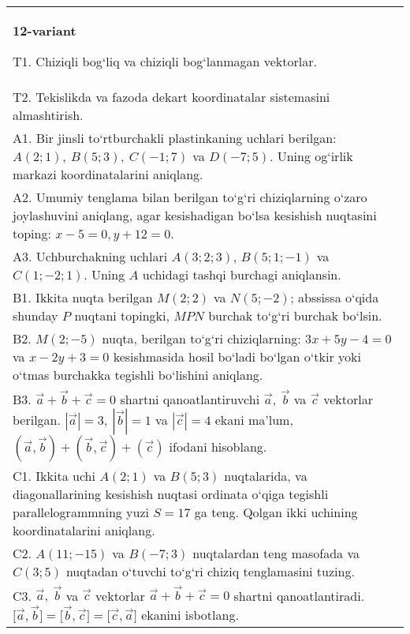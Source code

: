 \documentclass{article}
\begin{document}
\begin{tabular}{m{17cm}}
\textbf{12-variant}
\newline

T1. 
Chiziqli bog‘liq va chiziqli bog‘lanmagan vektorlar.
 \\
T2. Tekislikda va fazoda dekart koordinatalar sistemasini almashtirish.
 \\
A1. 
Bir jinsli to‘rtburchakli plastinkaning uchlari berilgan:
$A (2;1), \ B (5;3), \ C (-1;7) $ va $D (-7;5) $. Uning og‘irlik markazi
koordinatalarini aniqlang.
 \\
A2. 
Umumiy tenglama bilan berilgan to‘g‘ri chiziqlarning
o‘zaro joylashuvini aniqlang, agar kesishadigan bo‘lsa kesishish nuqtasini
toping: $x-5=0, y+12=0$.
 \\
A3. 
Uchburchakning uchlari
$A (3;2; 3) $, $B (5;1; - 1) $ va $C (1; -2;1) $. Uning $A$ uchidagi tashqi burchagi aniqlansin.
 \\
B1. 
Ikkita nuqta berilgan \(M (2;2) \) va \(N (5;-2) \); abssissa o‘qida shunday $P$ nuqtani topingki, $MPN$ burchak to‘g‘ri burchak bo‘lsin.
 \\
B2. 
\(M (2;-5) \) nuqta, berilgan to‘g‘ri chiziqlarning:
\(3x+5y-4=0\) va \(x-2y+3=0\) kesishmasida hosil bo‘ladi
bo‘lgan o‘tkir yoki o‘tmas burchakka tegishli bo‘lishini aniqlang.
 \\
B3. 
$\vec{a} + \vec{b} + \vec{c} = 0$ shartni qanoatlantiruvchi $\vec{a},\ \vec{b}$ va $\vec{c}$ vektorlar berilgan. $|\vec{a}| = 3,\ |\vec{b}| = 1$ va $|\vec{c}| = 4$ ekani ma’lum, $\left(\vec{a},\vec{b} \right) + \left(\vec{b},\vec{c} \right) + (\vec{c}) $ ifodani hisoblang.
 \\
C1. 
Ikkita uchi \(A (2;1) \) va \(B (5; 3) \) nuqtalarida, va
diagonallarining kesishish nuqtasi ordinata o‘qiga tegishli
parallelogrammning yuzi \(S = 17\) ga teng. Qolgan ikki uchining
koordinatalarini aniqlang. \\
C2. 
\(A (11; - 15) \) va \(B (-7;3) \) nuqtalardan
teng masofada va \(C (3; 5) \) nuqtadan o‘tuvchi to‘g‘ri chiziq tenglamasini
tuzing.
 \\
C3. 
\(\vec{a},\ \vec{b}\) va \(\vec{c}\) vektorlar \(\vec{a} + \vec{b} + \vec{c} = 0\) shartni qanoatlantiradi. \(\lbrack\vec{a},\vec{b}\rbrack = \lbrack\vec{b},\vec{c}\rbrack = \lbrack\vec{c},\vec{a}\rbrack\) ekanini isbotlang.
 \\

\end{tabular}
\vspace{1cm}
\end{document}
